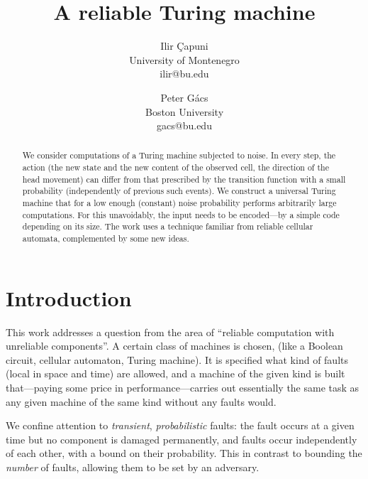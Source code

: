 \documentclass[11pt]{memoir}
\theoremstyle{definition} %
\begin{document}
\title{A reliable Turing machine}

\author{Ilir \c{C}apuni 
\\ University of Montenegro
\\ ilir@bu.edu
\and
Peter G\'acs
\\ Boston University
\\ gacs@bu.edu
}
\maketitle

\begin{abstract}
  We consider computations of a Turing machine subjected to noise.
  In every step, the action (the new state and the new content of the observed
  cell, the direction of the head movement) can differ from that prescribed by
  the transition function with a small probability (independently of previous
  such events).  We construct a universal Turing machine that for a low enough
  (constant) noise probability performs arbitrarily large computations.  For
  this unavoidably, the input needs to be encoded---by a simple code depending
  on its size.  The work uses a technique familiar from reliable cellular
  automata, complemented by some new ideas.
\end{abstract}

\newpage


\section{Introduction}

This work addresses a question from the area of ``reliable computation with unreliable components''.
A certain class of machines is chosen, (like a Boolean circuit, cellular automaton, Turing machine).
It is specified what kind of faults (local in space and time)
are allowed, and a machine of the given
kind is built that---paying some price in performance---carries out essentially the same
task as any given machine of the same kind without any faults would.

We confine attention to \emph{transient}, \emph{probabilistic} faults:
the fault occurs at a given time but no component is damaged permanently,
and faults occur independently of each other, with a bound on their probability.
This in contrast to bounding the \emph{number} of faults, allowing them to be set by an adversary.
\end{document}
